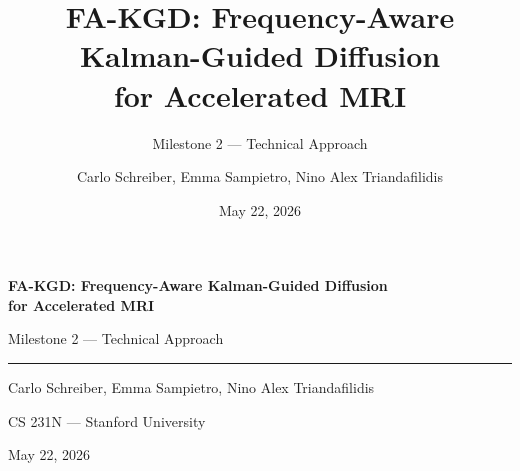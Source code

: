 \documentclass[aspectratio=169]{beamer}
\title{FA-KGD: Frequency-Aware Kalman-Guided Diffusion\\for Accelerated MRI}
\subtitle{Milestone 2 --- Technical Approach}
\author{Carlo Schreiber, Emma Sampietro, Nino Alex Triandafilidis}
\institute{CS 231N --- Stanford University}
\date{May 22, 2026}
\begin{document}
\begin{frame}[plain]
  \vfill
  {\Large\bfseries FA-KGD: Frequency-Aware Kalman-Guided Diffusion\\for Accelerated MRI\par}
  \vspace{0.5em}
  {\normalsize Milestone 2 --- Technical Approach\par}
  \vspace{0.6em}
  {\color{stanfordred}\rule{0.82\textwidth}{1.2pt}}
  \vspace{0.8em}

  {\small Carlo Schreiber, Emma Sampietro, Nino Alex Triandafilidis\par}
  \vspace{0.35em}
  {\small CS 231N --- Stanford University\par}
  \vspace{0.35em}
  {\small May 22, 2026\par}
  \vfill
\end{frame}
\end{document}
